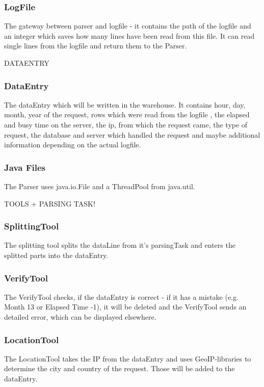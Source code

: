 \subsubsection*{LogFile}
The gateway between parser and logfile - it contains the path of the logfile and an integer 
which saves how many lines have been read from this file. It can read single lines from the logfile and return them to 
the Parser.

DATAENTRY

\subsubsection*{DataEntry}
The dataEntry which will be written in the warehouse. It contains hour, day, month, year of the request, rows which were read 
from the logfile%
, the elapsed and busy time on the server, the ip, from which the request came, the type of request, the database
and server which handled the request and maybe additional information depending on the actual logfile.

\newline\newline
\subsubsection*{Java Files}
The Parser uses java.io.File and a ThreadPool from java.util.

TOOLS + PARSING TASK!

\subsubsection*{SplittingTool}
The splitting tool splits the dataLine from it's parsingTask and enters the splitted parts into the dataEntry.

\subsubsection*{VerifyTool}
The VerifyTool checks, if the dataEntry is correct - if it has a mistake (e.g. Month 13 or Elapsed Time -1), it will 
be deleted and the VerifyTool sends an detailed error, which can be displayed elsewhere.

\subsubsection*{LocationTool}
The LocationTool takes the IP from the dataEntry and uses GeoIP-libraries to determine the city and country of the request.
Those will be added to the dataEntry.


